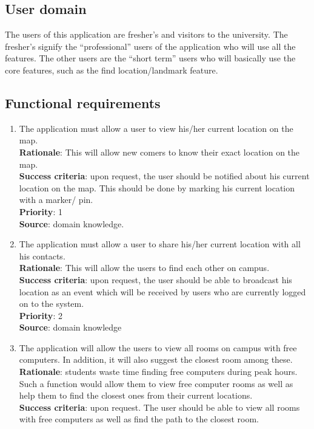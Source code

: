 \documentclass[10pt,a4paper,oneside]{report}
\begin{document}
\subsection*{User domain}
The users of this application are fresher’s and visitors  to the university.  The fresher’s signify the “professional” users of the application who will use all the features. The other users are the “short term” users who will basically use the core features, such as the find location/landmark feature.

\subsection*{Functional requirements}
\small{
\begin{enumerate}
\item{The application must allow a user to view his/her current location on the map. \\
  \textbf{Rationale}: This will allow new comers to know their exact location on the map.\\
  \textbf{Success criteria}: upon request, the user should be notified about his current location on the map. This should be done by marking his current location with a marker/ pin.\\
  \textbf{Priority}: 1\\
  \textbf{Source}: domain knowledge.\\
}
\item{The application must allow a user to share his/her current location with all his contacts. \\
  \textbf{Rationale}: This will allow the users to find each other on campus.\\
  \textbf{Success criteria}: upon request, the user should be able to broadcast his location as an event which will be received by users who are currently logged on to the system.\\
  \textbf{Priority}: 2\\
  \textbf{Source}: domain knowledge
}
\item{The application will allow the users to view all rooms on campus with free computers. In addition, it will also suggest the closest room among these. \\
  \textbf{Rationale}: students waste time finding free computers during peak hours. Such a function would allow them to view free computer rooms as well as help them to find the closest ones from their current locations.\\
  \textbf{Success criteria}: upon request. The user should be able to view all rooms with free computers as well as find the path to the closest room.\\
}
\end{enumerate}}
\end{document}
